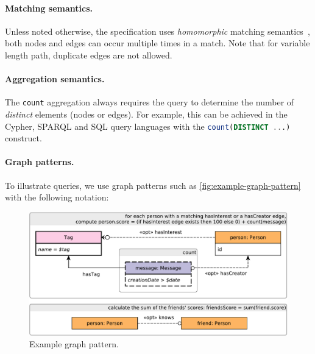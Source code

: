 \paragraph{Matching semantics.}

Unless noted otherwise, the specification uses \emph{homomorphic} matching 
semantics~\cite{DBLP:journals/csur/AnglesABHRV17}, \ie both nodes and edges can 
occur multiple times in a match. Note that for variable length path, duplicate 
edges are not allowed.

\paragraph{Aggregation semantics.}

The \lstinline{count} aggregation always requires the query to determine the number of \emph{distinct} elements (nodes or edges). For example, this can be achieved in the Cypher, SPARQL and SQL query languages with the \lstinline[language=sql]{count(DISTINCT ...)} construct.

\paragraph{Graph patterns.}

To illustrate queries, we use graph patterns such as \autoref{fig:example-graph-pattern} with the following notation:

\begin{figure}[ht]
	\begin{center}
		\includegraphics[scale=\patternscale,margin=0cm .2cm]{patterns/bi-read-08}
		\caption{Example graph pattern.}
		\label{fig:example-graph-pattern}
	\end{center}
\end{figure}

